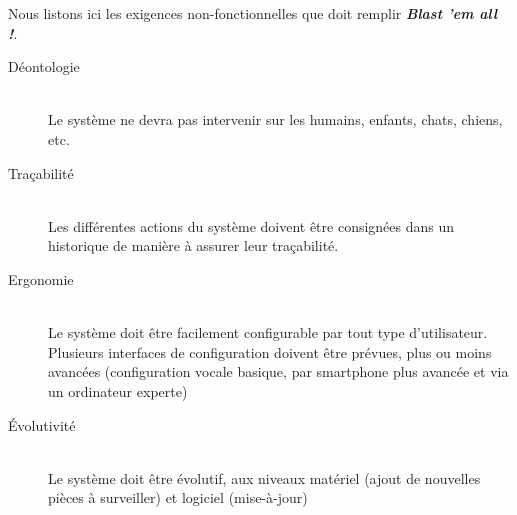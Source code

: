 \documentclass[12pt]{article}
\begin{document}
Nous listons ici les exigences non-fonctionnelles que doit remplir 
\textit{\textbf{Blast 'em all !}}.
\begin{description}
\item[Déontologie]\hfill\\
Le système ne devra pas intervenir sur les humains, enfants, chats, chiens, etc.
\item[Traçabilité]\hfill\\
Les différentes actions du système doivent être consignées dans un
historique de manière à assurer leur traçabilité.
\item[Ergonomie]\hfill\\
Le système doit être facilement configurable par tout type d'utilisateur.
Plusieurs interfaces de configuration doivent être prévues, plus ou moins
avancées (configuration vocale basique, par smartphone plus avancée et via
un ordinateur experte)
\item[Évolutivité]\hfill\\
Le système doit être évolutif, aux niveaux matériel (ajout de nouvelles
pièces à surveiller) et logiciel (mise-à-jour)
\end{description}
\end{document}
